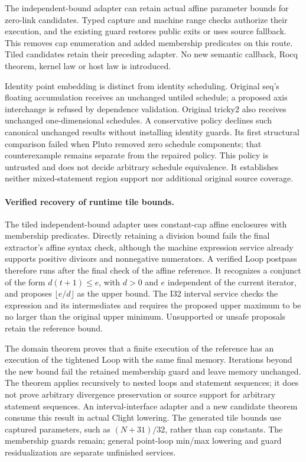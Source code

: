 The independent-bound adapter can retain actual affine parameter bounds for
zero-link candidates. Typed capture and machine range checks authorize their
execution, and the existing guard restores public exits or uses source fallback.
This removes cap enumeration and added membership predicates on this route.
Tiled candidates retain their preceding adapter. No new semantic callback,
Rocq theorem, kernel law or host law is introduced.

Identity point embedding is distinct from identity scheduling. Original seq's
floating accumulation receives an unchanged untiled schedule; a proposed axis
interchange is refused by dependence validation. Original tricky2 also receives
unchanged one-dimensional schedules. A conservative policy declines such
canonical unchanged results without installing identity guards. Its first
structural comparison failed when Pluto removed zero schedule components;
that counterexample remains separate from the repaired policy. This policy is
untrusted and does not decide arbitrary schedule equivalence. It establishes
neither mixed-statement region support nor additional original source coverage.

\paragraph{Verified recovery of runtime tile bounds.}
The tiled independent-bound adapter uses constant-cap affine enclosures with
membership predicates. Directly retaining a division bound fails the final
extractor's affine syntax check, although the machine expression service already
supports positive divisors and nonnegative numerators. A verified Loop postpass
therefore runs after the final check of the affine reference. It recognizes a
conjunct of the form $d(t+1)\leq e$, with $d>0$ and $e$ independent of the current
iterator, and proposes $\lfloor e/d\rfloor$ as the upper bound. The I32 interval
service checks the expression and its intermediates and requires the proposed
upper maximum to be no larger than the original upper minimum. Unsupported or
unsafe proposals retain the reference bound.

The domain theorem proves that a finite execution of the reference has an
execution of the tightened Loop with the same final memory. Iterations beyond
the new bound fail the retained membership guard and leave memory unchanged.
The theorem applies recursively to nested loops and statement sequences; it
does not prove arbitrary divergence preservation or source support for arbitrary
statement sequences. An interval-interface adapter and a new candidate theorem
consume this result in actual Clight lowering. The generated tile bounds use
captured parameters, such as $(N+31)/32$, rather than cap constants. The membership
guards remain; general point-loop min/max lowering and guard residualization
are separate unfinished services.

